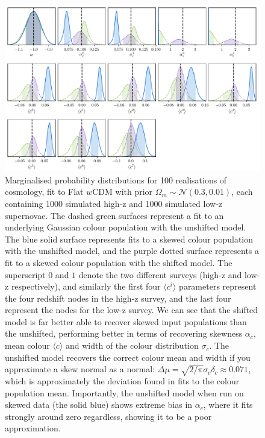 \documentclass[a4paper,fleqn,usenatbib]{mnras}
\begin{document}
\begin{figure}
	\begin{center}
		\includegraphics[width=\textwidth]{simple_w_shift_dist_0.pdf}
	\end{center}
	\caption{Marginalised probability distributions for 100 realisations of cosmology, fit to Flat $w$CDM with prior $\Omega_m \sim \mathcal{N}(0.3, 0.01)$, each containing 1000 simulated high-z and 1000 simulated low-z supernovae. The dashed green surfaces represent a fit to an underlying Gaussian colour population with the unshifted model. The blue solid surface represents fits to a skewed colour population with the unshifted model, and the purple dotted surface represents a fit to a skewed colour population with the shifted model. The superscript $0$ and $1$ denote the two different surveys (high-z and low-z respectively), and similarly the first four $\langle c^i \rangle$ parameters represent the four redshift nodes in the high-z survey, and the last four represent the nodes for the low-z survey. We can see that the shifted model is far better able to recover skewed input populations than the unshifted, performing better in terms of recovering skewness $\alpha_c$, mean colour $\langle c \rangle$ and width of the colour distribution $\sigma_c$. The unshifted model recovers the correct colour mean and width if you approximate a skew normal as a normal: $\Delta\mu = \sqrt{2/\pi}\sigma_c\delta_c \approx 0.071$, which is approximately the deviation found in fits to the colour population mean. Importantly, the unshifted model when run on skewed data (the solid blue) shows extreme bias in $\alpha_c$, where it fits strongly around zero regardless, showing it to be a poor approximation.}
	\label{fig:simple_w_super}
\end{figure}
\end{document}
